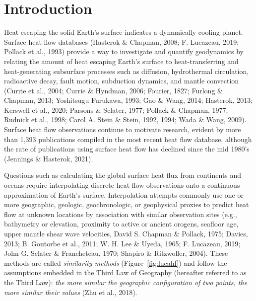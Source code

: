 \documentclass[draft,linenumbers]{agujournal2018}
\begin{document}
\section{Introduction}

Heat escaping the solid Earth's surface indicates a dynamically cooling
planet. Surface heat flow databases (Hasterok \& Chapman, 2008; F.
Lucazeau, 2019; Pollack et al., 1993) provide a way to investigate and
quantify geodynamics by relating the amount of heat escaping Earth's
surface to heat-transferring and heat-generating subsurface processes
such as diffusion, hydrothermal circulation, radioactive decay, fault
motion, subduction dynamics, and mantle convection (Currie et al., 2004;
Currie \& Hyndman, 2006; Fourier, 1827; Furlong \& Chapman, 2013;
Yoshitsugu Furukawa, 1993; Gao \& Wang, 2014; Hasterok, 2013; Kerswell
et al., 2020; Parsons \& Sclater, 1977; Pollack \& Chapman, 1977;
Rudnick et al., 1998; Carol A. Stein \& Stein, 1992, 1994; Wada \& Wang,
2009). Surface heat flow observations continue to motivate research,
evident by more than 1,393 publications compiled in the most recent heat
flow database, although the rate of publications using surface heat flow
has declined since the mid 1980's (Jennings \& Hasterok, 2021).

Questions such as calculating the global surface heat flux from
continents and oceans require interpolating discrete heat flow
observations onto a continuous approximation of Earth's surface.
Interpolation attempts commonly use one or more geographic, geologic,
geochronologic, or geophysical proxies to predict heat flow at unknown
locations by association with similar observation sites (e.g.,
bathymetry or elevation, proximity to active or ancient orogens,
seafloor age, upper mantle shear wave velocities, David S. Chapman \&
Pollack, 1975; Davies, 2013; B. Goutorbe et al., 2011; W. H. Lee \&
Uyeda, 1965; F. Lucazeau, 2019; John G. Sclater \& Francheteau, 1970;
Shapiro \& Ritzwoller, 2004). These methods are called \emph{similarity
methods} (Figure~\ref{fig:lucahf}) and follow the assumptions embedded
in the Third Law of Geography (hereafter referred to as the Third Law):
\emph{the more similar the geographic configuration of two points, the
more similar their values} (Zhu et al., 2018).
\end{document}
